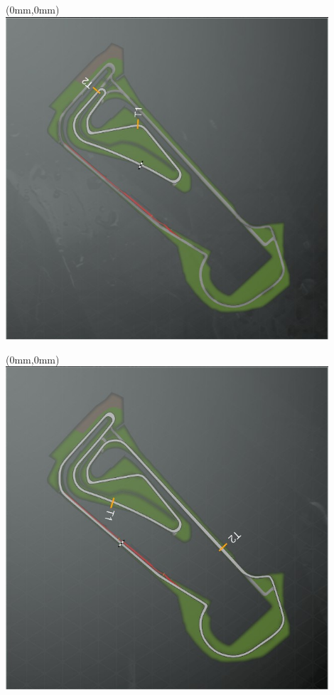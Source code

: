 \null\newpage
\begin{textblock*}{30mm}(0mm,0mm)%
\includegraphics[width=120mm]{TR/2015-05-20_00062.png}
\end{textblock*}
\null\newpage
\begin{textblock*}{30mm}(0mm,0mm)%
\includegraphics[width=120mm]{TR/2015-05-20_00060.png}
\end{textblock*}
